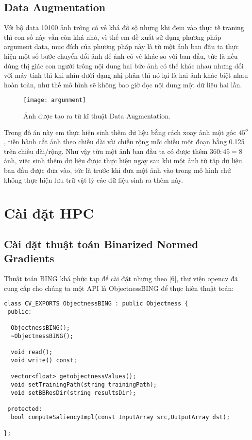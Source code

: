 \documentclass[13pt, a4paper]{extreport}
\begin{document}
\subsection{Data Augmentation}
\indent Với bộ data 10100 ảnh trông có vẻ khá đồ sộ nhưng  khi đem vào thực tế traning thì con số này vẫn còn khá nhỏ, vì thế em đề xuất sử dụng phương pháp argument data, mục đích của phương pháp này là từ một ảnh ban đầu ta thực hiện một số bước chuyển đổi ảnh để ảnh có vẻ khác so với ban đầu, tức là nếu dùng thị giác con người trông nội dung hai bức ảnh có thể khác nhau nhưng đối với máy tính thì khi nhìn dưới dạng nhị phân thì nó lại là hai ảnh khác biệt nhau hoàn toàn, như thế mô hình sẽ không bao giờ đọc nội dung một dữ liệu hai lần. \\
\begin{figure}[H]
  \centering
  \captionsetup{justification=centering,margin=2cm}
    \texttt{[image: argunment]}
   \caption{\large Ảnh được tạo ra từ kĩ thuật Data Augmentation.}
\end{figure}
\indent Trong đồ án này em thực hiện sinh thêm dữ liệu bằng cách xoay ảnh một góc $45^o$ , tiến hành cắt ảnh theo chiều dài vài chiều rộng mỗi chiều một đoạn bằng 0.125 trên chiều dài/rộng. Như vậy từu một ảnh ban đầu ta có được thêm $360 : 45 = 8$ ảnh, việc sinh thêm dữ liệu được thực hiện ngay sau khi một ảnh từ tập dữ liệu ban đầu được đưa vào, tức là trước khi đưa một ảnh vào trong mô hình chứ không thực hiện lưu trữ vật lý các dữ liệu sinh ra thêm này.
\section{Cài đặt HPC}
\subsection{Cài đặt thuật toán Binarized Normed Gradients}
\indent Thuật toán BING khá phức tạp để cài đặt nhưng theo [6], thư viện opencv đã cung cấp cho chúng ta một API là ObjectnessBING để thực hiên thuật toán:
\begin{lstlisting}
class CV_EXPORTS ObjectnessBING : public Objectness {
 public:

  ObjectnessBING();
  ~ObjectnessBING();

  void read();
  void write() const;

  vector<float> getobjectnessValues();
  void setTrainingPath(string trainingPath);
  void setBBResDir(string resultsDir);

 protected:
  bool computeSaliencyImpl(const InputArray src,OutputArray dst);

};
\end{lstlisting}
\end{document}

